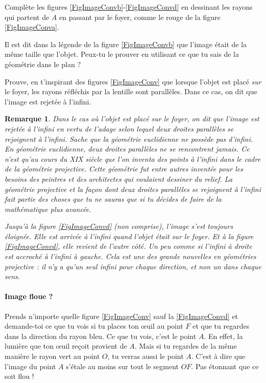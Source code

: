 \documentclass[a4paper,12pt]{book}
\newcounter{numtho}
\theoremstyle{mes_exemples}	\newtheorem{exemple}[numtho]{Exemple}
\newtheorem{remark}[numtho]{Remarque}
\theoremstyle{mes_tho}
\begin{document}
\begin{exercice}
Complète les figures \ref{FigImageConvb}-\ref{FigImageConvd} en dessinant les rayons qui partent de $A$ en passant par le foyer, comme le rouge de la figure \ref{FigImageConva}.
\end{exercice}

\begin{exercice}
Il est dit dans la légende de la figure \ref{FigImageConvb} que l'image était de la même taille que l'objet. Peux-tu le prouver en utilisant ce que tu sais de la géométrie dans le plan ?
\end{exercice}

\begin{exercice}
Prouve, en t'inspirant des figures \ref{FigImageConv} que lorsque l'objet est placé \emph{sur} le foyer, les rayons réfléchis par la lentille sont parallèles. Dans ce cas, on dit que l'image est rejetée à l'infini.
\end{exercice}

\begin{remark}
Dans le cas où l'objet est placé sur le foyer, on dit que l'image est rejetée à l'infini en vertu de l'adage selon lequel \og deux droites parallèles se rejoignent à l'infini\fg{}. Sache que la géométrie euclidienne ne possède pas d'infini. En géométrie euclidienne, deux droites parallèles ne se rencontrent jamais. Ce n'est qu'au cours du XIX\ieme{} siècle que l'on inventa des points à l'infini dans le cadre de la \emph{géométrie projective}. Cette géométrie fut entre autres inventée pour les besoins des peintres et des architectes qui voulaient dessiner du relief. La géométrie projective et la façon dont deux droites parallèles se rejoignent à l'infini fait partie des choses que tu ne sauras que si tu décides de faire de la mathématique plus avancée.

Jusqu'à la figure \ref{FigImageConvd} (non comprise), l'image s'est toujours éloignée. Elle est arrivée à l'infini quand l'objet était sur le foyer. Et à la figure \ref{FigImageConvd}, elle revient \emph{de l'autre côté}. Un peu comme si l'infini à droite est accroché à l'infini à gauche. Cela est une des grande nouvelles en géométries projective : il n'y a qu'un seul infini pour chaque direction, et non un dans chaque sens.
\end{remark}

\paragraph{Image floue ?} Prends n'importe quelle figure \ref{FigImageConv} sauf la \ref{FigImageConvd} et demande-toi ce que tu vois si tu places ton \oe uil au point $F$ et que tu regardes dans la direction du rayon bleu. Ce que tu vois, c'est le point $A$. En effet, la lumière que ton \oe uil reçoit provient de $A$. Mais si tu regardes de la même manière le rayon vert au point $O$, tu verras aussi le point $A$. C'est à dire que l'image du point $A$ s'étale au moins sur tout le segment $OF$. Pas étonnant que ce soit flou !
\end{document}
